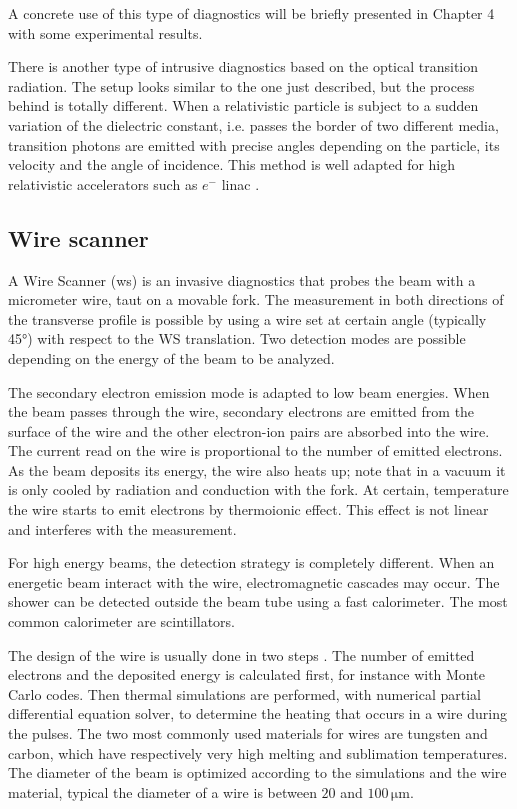 \begin{refsection}
  A concrete use of this type of diagnostics will be briefly presented in Chapter 4 with some experimental results.

  There is another type of intrusive diagnostics based on the optical transition radiation. The setup looks similar to the one just described, but the process behind is totally different. When a relativistic particle is subject to a sudden variation of the dielectric constant, i.e. passes the border of two different media, transition photons are emitted with precise angles depending on the particle, its velocity and the angle of incidence. This method is well adapted for high relativistic accelerators such as $e^{-}$ \acrshort{linac} \cite{Nolle2009,Bolzon2013}.

  \subsection{Wire scanner}
  A Wire Scanner (\acrshort{ws}) is an invasive diagnostics that probes the beam with a micrometer wire, taut on a movable fork. The measurement in both directions of the transverse profile is possible by using a wire set at certain angle (typically 45°) with respect to the WS translation. Two detection modes are possible depending on the energy of the beam to be analyzed.

  The secondary electron emission mode is adapted to low beam energies. When the beam passes through the wire, secondary electrons are emitted from the surface of the wire and the other electron-ion pairs are absorbed into the wire. The current read on the wire is proportional to the number of emitted electrons. As the beam deposits its energy, the wire also heats up; note that in a vacuum it is only cooled by radiation and conduction with the fork. At certain, temperature the wire starts to emit electrons by thermoionic effect. This effect is not linear and interferes with the measurement.

  For high energy beams, the detection strategy is completely different. When an energetic beam interact with the wire, electromagnetic cascades may occur. The shower can be detected outside the beam tube using a fast calorimeter. The most common calorimeter are scintillators.%

  The design of the wire is usually done in two steps \cite{Cheymol:LINAC2014-MOPP036}. The number of emitted electrons and the deposited energy is calculated first, for instance with Monte Carlo codes. Then thermal simulations are performed, with numerical partial differential equation solver, to determine the heating that occurs in a wire during the pulses. The two most commonly used materials for wires are tungsten and carbon, which have respectively very high melting and sublimation temperatures. The diameter of the beam is optimized according to the simulations and the wire material, typical the diameter of a wire is between $20$ and $100\,\mathrm{\mu m}$.


\end{refsection}
